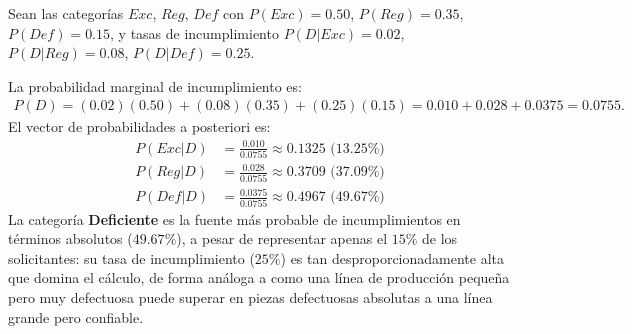 \begin{solproblema}[prob:3bf9f42]
	Sean las categorías $Exc$, $Reg$, $Def$ con $P(Exc)=0.50$, $P(Reg)=0.35$, $P(Def)=0.15$, y tasas de incumplimiento $P(D|Exc)=0.02$, $P(D|Reg)=0.08$, $P(D|Def)=0.25$.

	La probabilidad marginal de incumplimiento es:
	\begin{align}
		P(D) = (0.02)(0.50)+(0.08)(0.35)+(0.25)(0.15) = 0.010+0.028+0.0375 = 0.0755.
	\end{align}
	El vector de probabilidades a posteriori es:
	\begin{align}
		P(Exc|D) &= \frac{0.010}{0.0755} \approx 0.1325 \text{ (13.25\%)} \\
		P(Reg|D) &= \frac{0.028}{0.0755} \approx 0.3709 \text{ (37.09\%)} \\
		P(Def|D) &= \frac{0.0375}{0.0755} \approx 0.4967 \text{ (49.67\%)}
	\end{align}
	La categoría \textbf{Deficiente} es la fuente más probable de incumplimientos en términos absolutos ($49.67\%$), a pesar de representar apenas el $15\%$ de los solicitantes: su tasa de incumplimiento ($25\%$) es tan desproporcionadamente alta que domina el cálculo, de forma análoga a como una línea de producción pequeña pero muy defectuosa puede superar en piezas defectuosas absolutas a una línea grande pero confiable.
\end{solproblema}
